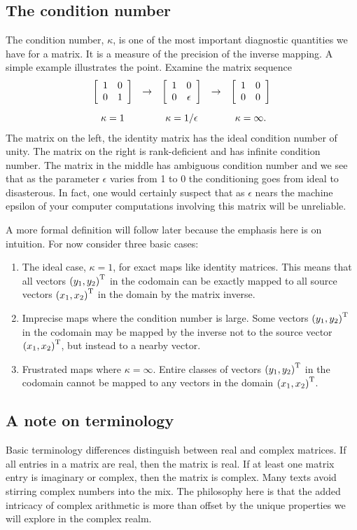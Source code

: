 \subsection{The condition number}
The condition number, $\kappa$, is one of the most important diagnostic quantities we have for a matrix. It is a measure of the precision of the inverse mapping. A simple example illustrates the point. Examine the matrix sequence
\begin{equation}
\begin{array}{ccccc}
  \mat{cc}{1&0\\0&1} & \to & \mat{cc}{1&0\\0&\epsilon} & \to & \mat{cc}{1&0\\0&0}\\[15pt]
  \kappa = 1 && \kappa = 1/\epsilon && \kappa = \infty.
\end{array}
\end{equation}
The matrix on the left, the identity matrix has the ideal condition number of unity. The matrix on the right is rank-deficient and has infinite condition number. The matrix in the middle has ambiguous condition number and we see that as the parameter $\epsilon$ varies from 1 to 0 the conditioning goes from ideal to disasterous. In fact, one would certainly suspect that as $\epsilon$ nears the machine epsilon of your computer computations involving this matrix will be unreliable.

A more formal definition will follow later because the emphasis here is on intuition. For now consider three basic cases:
\begin{enumerate}
\item The ideal case, $\kappa=1$, for exact maps like identity matrices. This means that all vectors $\paren{y_{1},y_{2}}^{\mathrm{T}}$ in the codomain  can be exactly mapped to all source vectors $\paren{x_{1},x_{2}}^{\mathrm{T}}$ in the domain by the matrix inverse.
\item Imprecise maps where the condition number is large. Some vectors $\paren{y_{1},y_{2}}^{\mathrm{T}}$ in the codomain may be mapped by the inverse not to the source vector $\paren{x_{1},x_{2}}^{\mathrm{T}}$, but instead to a nearby vector.
\item Frustrated maps where $\kappa=\infty$. Entire classes of vectors $\paren{y_{1},y_{2}}^{\mathrm{T}}$ in the codomain cannot be mapped to any vectors in the domain $\paren{x_{1},x_{2}}^{\mathrm{T}}$.
\end{enumerate}

\subsection{A note on terminology}
Basic terminology differences distinguish between real and complex matrices. If all entries in a matrix are real, then the matrix is real. If at least one matrix entry is imaginary or complex, then the matrix is complex. Many texts avoid stirring complex numbers into the mix. The philosophy here is that the added intricacy of complex arithmetic is more than offset by the unique properties we will explore in the complex realm.

